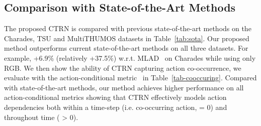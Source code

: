 \documentclass{bmvc2k}
\begin{document}
\begin{table}[t!]\tabcolsep=9pt
\caption{Evaluation on the Charades dataset using the action-conditional metric~\cite{MLAD}.  - Action-Conditional Precision,  - Action-Conditional Recall,  - Action-Conditional F1-Score,  - Action-Conditional Mean Average Precision.  indicates the temporal window size.  corresponds to the actions occuring at the same time.}
\end{table}



\subsection{Comparison with State-of-the-Art Methods}
The proposed CTRN is compared with previous state-of-the-art methods on the Charades, TSU and MultiTHUMOS datasets in Table~\ref{tab:sota}.
Our proposed method outperforms current state-of-the-art methods on all three datasets. For example, +6.9\% (relatively +37.5\%) w.r.t. MLAD~\cite{MLAD} on Charades while using only RGB. We then show the ability of CTRN capturing action co-occurrence, we evaluate with the action-conditional metric~\cite{MLAD} in Table~\ref{tab-cooccuring}. Compared with state-of-the-art methods, our method achieves higher performance on all action-conditional metrics showing that CTRN effectively models action dependencies both within a time-step (i.e. co-occurring action,  = 0) and throughout time ( > 0). 
\end{document}
